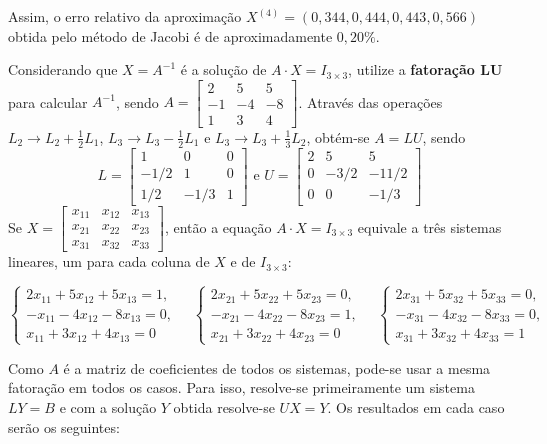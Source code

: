\documentclass[12pt,a4paper]{article}
\begin{document}
\begin{ExerciseList}
Assim, o erro relativo da aproximação $X^{(4)} = (0,344, 0,444, 0,443, 0,566)$ obtida pelo método de Jacobi é de aproximadamente $0,20\%$.


\Exercise[title={2,5}]
Considerando que $X = A^{-1}$ é a solução de $A\cdot X = I_{3 \times 3}$, utilize a \textbf{fatoração LU} para calcular $A^{-1}$, sendo
$A = \begin{bmatrix}
 2&  5&  5\\
-1& -4& -8\\
 1&  3&  4
\end{bmatrix}$.
\Answer
Através das operações $L_2 \to L_2 + \frac{1}{2} L_1$, $L_3 \to L_3 -\frac{1}{2} L_1$ e $L_3 \to L_3 +\frac{1}{3} L_2$, obtém-se $A = LU$, sendo
\[
L =
\begin{bmatrix}
 1   &  0   & 0\\
-1/2 &  1   & 0\\
 1/2 & -1/3 & 1
\end{bmatrix}
\text{ e }
U =
\begin{bmatrix}
2 &   5  &   5  \\
0 & -3/2 & -11/2\\
0 &   0  &  -1/3
\end{bmatrix}
\]
Se $X = \begin{bmatrix}
x_{11} & x_{12} & x_{13}\\
x_{21} & x_{22} & x_{23}\\
x_{31} & x_{32} & x_{33}
\end{bmatrix}$,
então a equação $A\cdot X = I_{3 \times 3}$ equivale a três sistemas lineares, um para cada coluna de $X$ e de $I_{3 \times 3}$:
\begin{small}
\[
\begin{cases}
2x_{11}+5x_{12}+5x_{13} = 1,\\
-x_{11}-4x_{12}-8x_{13} = 0,\\
 x_{11}+3x_{12}+4x_{13} = 0
\end{cases}
\quad
\begin{cases}
2x_{21}+5x_{22}+5x_{23} = 0,\\
-x_{21}-4x_{22}-8x_{23} = 1,\\
 x_{21}+3x_{22}+4x_{23} = 0
\end{cases}
\quad
\begin{cases}
2x_{31}+5x_{32}+5x_{33} = 0,\\
-x_{31}-4x_{32}-8x_{33} = 0,\\
 x_{31}+3x_{32}+4x_{33} = 1
\end{cases}
\]
\end{small}
Como $A$ é a matriz de coeficientes de todos os sistemas, pode-se usar a mesma fatoração em todos os casos. Para isso, resolve-se primeiramente um sistema $LY=B$ e com a solução $Y$ obtida resolve-se $UX = Y$. Os resultados em cada caso serão os seguintes:

\end{ExerciseList}
\end{document}
